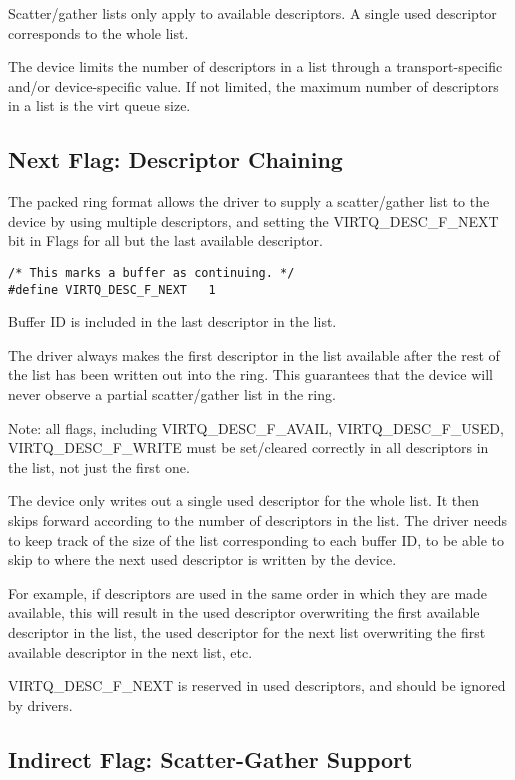 Scatter/gather lists only apply to available descriptors. A
single used descriptor corresponds to the whole list.

The device limits the number of descriptors in a list through a
transport-specific and/or device-specific value. If not limited,
the maximum number of descriptors in a list is the virt queue
size.

\subsection{Next Flag: Descriptor Chaining}
\label{sec:Packed Virtqueues / Next Flag: Descriptor Chaining}

The packed ring format allows the driver to supply
a scatter/gather list to the device
by using multiple descriptors, and setting the VIRTQ_DESC_F_NEXT bit in
Flags for all but the last available descriptor.

\begin{lstlisting}
/* This marks a buffer as continuing. */
#define VIRTQ_DESC_F_NEXT   1
\end{lstlisting}

Buffer ID is included in the last descriptor in the list.

The driver always makes the first descriptor in the list
available after the rest of the list has been written out into
the ring. This guarantees that the device will never observe a
partial scatter/gather list in the ring.

Note: all flags, including VIRTQ_DESC_F_AVAIL, VIRTQ_DESC_F_USED,
VIRTQ_DESC_F_WRITE must be set/cleared correctly in all
descriptors in the list, not just the first one.

The device only writes out a single used descriptor for the whole
list. It then skips forward according to the number of
descriptors in the list. The driver needs to keep track of the size
of the list corresponding to each buffer ID, to be able to skip
to where the next used descriptor is written by the device.

For example, if descriptors are used in the same order in which
they are made available, this will result in the used descriptor
overwriting the first available descriptor in the list, the used
descriptor for the next list overwriting the first available
descriptor in the next list, etc.

VIRTQ_DESC_F_NEXT is reserved in used descriptors, and
should be ignored by drivers.

\subsection{Indirect Flag: Scatter-Gather Support}
\label{sec:Packed Virtqueues / Indirect Flag: Scatter-Gather Support}

